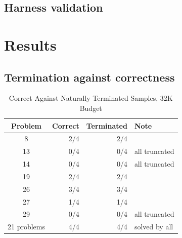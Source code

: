 \documentclass[conference]{IEEEtran}
\newif\ifdraft
\newcommand{\writehere}[2]{%
  \ifdraft
    {\color{orange!75!black}\small\textbf{[WRITE: #1]}\itshape\ #2\par}
    \medskip
  \fi}
\begin{document}
\subsection{Harness validation}

\writehere{2 paragraphs}{
First check: the baseline reproduction gave 80.8 against the published 91.4. The
direction matters, so say it: the figure is lower, which argues against
contamination inflating anything.
\\
Second check: the identity in (\ref{eq:prefix}) tested directly. An 8,192 token
condition measured two ways, a genuine 8k run and truncated 16k traces, gave 54.2
and 55.8 percent. Two samples out of 120, within noise at temperature 1.0. Every
later budget result depends on this holding.}

\section{Results}

\subsection{Termination against correctness}

\begin{table}[t]
\caption{Correct Against Naturally Terminated Samples, 32K Budget}
\label{tab:decomp}
\centering
\footnotesize
\begin{tabular}{@{}crrl@{}}
\toprule
\textbf{Problem} & \textbf{Correct} & \textbf{Terminated} & \textbf{Note} \\
\midrule
8  & 2/4 & 2/4 & \\
13 & 0/4 & 0/4 & all truncated \\
14 & 0/4 & 0/4 & all truncated \\
19 & 2/4 & 2/4 & \\
26 & 3/4 & 3/4 & \\
27 & 1/4 & 1/4 & \\
29 & 0/4 & 0/4 & all truncated \\
\midrule
21 problems & 4/4 & 4/4 & solved by all \\
\bottomrule
\end{tabular}
\end{table}

\writehere{1 paragraph, arithmetic only, interpretation goes in Section VI}{
All 21 fully solved problems also terminated on all four samples, contributing 84
samples. Aggregating, 97 correct and 95 terminated, so among the 95 that
terminated essentially every one was correct. Of the 25 truncated, 23 scored zero.
Keep it factual here.}
\end{document}
